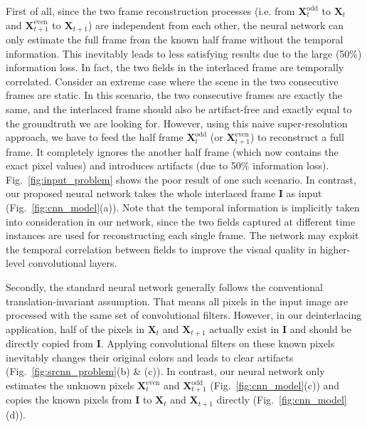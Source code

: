 First of all, since the two frame reconstruction processes (i.e. from
$\mathbf{X}^{\text{odd}}_{t}$ to $\mathbf{X}_t$ and
$\mathbf{X}^{\text{even}}_{t+1}$ to $\mathbf{X}_{t+1}$) are independent from
each other, the neural network can only estimate the full frame from the known
half frame without the temporal information. This inevitably leads to less
satisfying results due to the large (50\%) information loss. In fact, the two
fields in the interlaced frame are temporally correlated. Consider an extreme
case where the scene in the two consecutive frames are static. In this scenario,
the two consecutive frames are exactly the same, and the interlaced frame should
also be artifact-free and exactly equal to the groundtruth we are looking for.
However, using this naive super-resolution approach, we have to feed the half
frame $\mathbf{X}^{\text{odd}}_t$ (or $\mathbf{X}^{\text{even}}_{t+1}$) to
reconstruct a full frame. It completely ignores the another half frame (which
now contains the exact pixel values) and introduces artifacts (due to 50\%
information loss). Fig.~\ref{fig:input_problem} shows the  poor result of one
such scenario. In contrast, our proposed neural network takes the whole
interlaced frame $\mathbf{I}$ as input (Fig.~\ref{fig:cnn_model}(a)). Note that
the temporal information is implicitly taken into consideration in our network,
since the two fields captured at different time instances are used for reconstructing each
single frame. The network may exploit the temporal correlation between fields to
improve the visual quality in higher-level convolutional layers.

Secondly, the standard neural network generally follows the conventional
translation-invariant assumption. That means all pixels in the input image are
processed with the same set of convolutional filters. However, in our deinterlacing
application, half of the pixels in $\mathbf{X}_t$ and $\mathbf{X}_{t+1}$ actually 
exist in $\mathbf{I}$ and should be directly copied from $\mathbf{I}$. 
Applying convolutional filters on these
known pixels inevitably changes their original colors and leads to clear
artifacts (Fig.~\ref{fig:srcnn_problem}(b) \& (c)). In contrast, our neural network only
estimates the unknown pixels $\mathbf{X}^{\text{even}}_t$ and
$\mathbf{X}^{\text{odd}}_{t+1}$ (Fig.~\ref{fig:cnn_model}(c)) and copies the known
pixels from $\mathbf{I}$ to $\mathbf{X}_t$ and $\mathbf{X}_{t+1}$ directly
(Fig.~\ref{fig:cnn_model}(d)).


